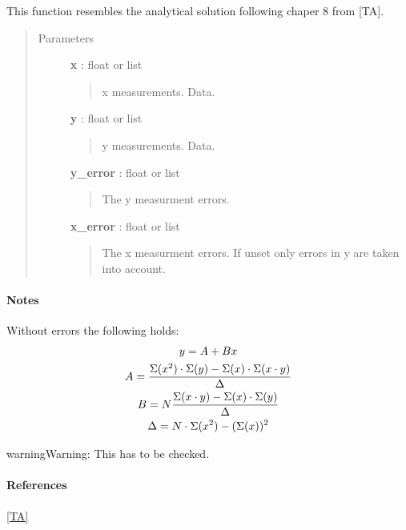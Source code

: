 \documentclass[a4paper,10pt,english]{sphinxmanual}
\begin{document}
\begin{fulllineitems}
\label{functions:astrolyze.functions.astro_functions.analytic_linear_fit}
This function resembles the analytical solution following chaper 8 from
{[}TA{]}.
\begin{quote}\begin{description}
\item[{Parameters }] \leavevmode
\textbf{x} : float or list
\begin{quote}

x measurements. Data.
\end{quote}

\textbf{y} : float or list
\begin{quote}

y measurements. Data.
\end{quote}

\textbf{y\_error} : float or list
\begin{quote}

The y measurment errors.
\end{quote}

\textbf{x\_error} : float or list
\begin{quote}

The x measurment errors. If unset only errors in y are taken into
account.
\end{quote}

\end{description}\end{quote}
\paragraph{Notes}

Without errors the following holds:
\begin{gather}
\begin{split}y = A + B x\end{split}\notag\\\begin{split}A = \frac{\Sigma(x^2) \cdot \Sigma(y) - \Sigma(x) \cdot
\Sigma(x \cdot y)}{\Delta}\end{split}\notag\\\begin{split}B = N \frac{\Sigma(x \cdot y) - \Sigma (x) \cdot \Sigma(y)}{\Delta}\end{split}\notag\\\begin{split}\Delta = N \cdot \Sigma(x^2) - (\Sigma(x))^2\end{split}\notag
\end{gather}
\begin{notice}{warning}{Warning:}
This has to be checked.
\end{notice}
\paragraph{References}

{\hyperref[functions:ta]{{[}TA{]}}}

\end{fulllineitems}
\end{document}

